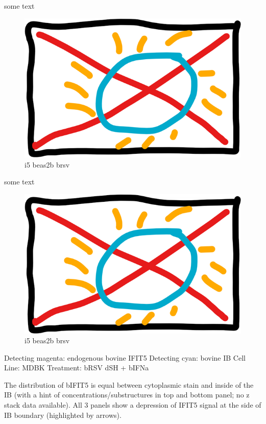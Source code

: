 some text

\begin{figure}
    \centering
    \includegraphics[width=0.5\linewidth]{06. Chapter 1//Figs/00. placeholder.png}
    \caption[i5 beas2b brsv]{i5 beas2b brsv}
    \label{i5 beas2b brsv}
\end{figure}

 \label{bIFIT5 Localisation During h/bRSV Infection}
some text

\begin{figure}
    \centering
    \includegraphics[width=0.5\linewidth]{06. Chapter 1//Figs/00. placeholder.png}
    \caption[i5 beas2b brsv]{i5 beas2b brsv}
    \label{i5 beas2b brsv}
\end{figure}

Detecting magenta: endogenous bovine IFIT5 \newline
Detecting cyan: bovine IB \newline
Cell Line: MDBK \newline
Treatment: bRSV dSH + bIFNa \newline

The distribution of bIFIT5 is equal between cytoplasmic stain and inside of the IB (with a hint of concentrations/substructures in top and bottom panel; no z stack data available). All 3 panels show a depression of IFIT5 signal at the side of IB boundary (highlighted by arrows).

